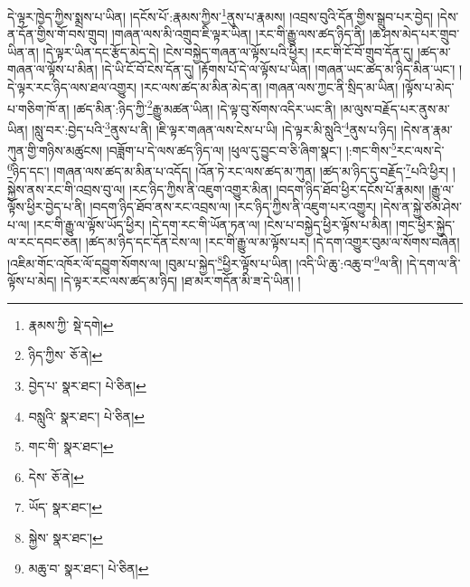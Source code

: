 དེ་ལྟར་ཁྱེད་ཀྱིས་སྨྲས་པ་ཡིན། །དངོས་པོ་:རྣམས་ཀྱིས་\footnote{རྣམས་ཀྱི་  སྡེ་དགེ། }ནུས་པ་རྣམས། །འབྲས་བུའི་དོན་གྱིས་སྒྲུབ་པར་བྱེད། །དེས་ན་དོན་གྱིས་གོ་བས་གྲུབ། །གཞན་ལས་མི་འགྲུབ་ཇི་ལྟར་ཡིན། །རང་གི་རྒྱུ་ལས་ཚད་ཉིད་ནི། །ཆ་ཤས་མེད་པར་གྲུབ་ཡིན་ན། །དེ་ལྟར་ཡིན་དང་རྩོད་མེད་དེ། །ངེས་བསྐྱེད་གཞན་ལ་ལྟོས་པའི་ཕྱིར། །རང་གི་ངོ་བོ་གྲུབ་དོན་དུ། །ཚད་མ་གཞན་ལ་ལྟོས་པ་མིན། །དེ་ཡི་ངོ་བོ་ངེས་དོན་དུ། །རྟོགས་པོ་དེ་ལ་ལྟོས་པ་ཡིན། །གཞན་ཡང་ཚད་མ་ཉིད་མིན་ཡང་། །དེ་ལྟར་རང་ཉིད་ལས་ཐལ་འགྱུར། །རང་ལས་ཚད་མ་མིན་མེད་ན། །གཞན་ལས་ཀྱང་ནི་སྲིད་མ་ཡིན། །ལྟོས་པ་མེད་པ་གཅིག་ཁོ་ན། །ཚད་མིན་:ཉིད་ཀྱི་\footnote{ཉིད་ཀྱིས་  ཅོ་ནེ། }རྒྱུ་མཚན་ཡིན། །དེ་ལྟ་བུ་སོགས་འདིར་ཡང་ནི། །མ་ལུས་བརྗོད་པར་ནུས་མ་ཡིན། །སླུ་བར་:བྱེད་པའི་\footnote{བྱེད་པ་  སྣར་ཐང་།  པེ་ཅིན། }ནུས་པ་ནི། །ཇི་ལྟར་གཞན་ལས་ངེས་པ་ཡི། །དེ་ལྟར་མི་སླུའི་\footnote{བསླུའི་  སྣར་ཐང་།  པེ་ཅིན། }ནུས་པ་ཉིད། །དེས་ན་རྣམ་ཀུན་གྱི་གཉིས་མཚུངས། །བཟློག་པ་དེ་ལས་ཚད་ཉིད་ལ། །ཕུལ་དུ་བྱུང་བ་ཅི་ཞིག་སྣང་། །:གང་གིས་\footnote{གང་གི་  སྣར་ཐང་། }རང་ལས་དེ་\footnote{དེས་  ཅོ་ནེ། }ཉིད་དང་། །གཞན་ལས་ཚད་མ་མིན་པ་འདོད། །འོན་ཏེ་རང་ལས་ཚད་མ་ཀུན། །ཚད་མ་ཉིད་དུ་བརྗོད་\footnote{ཡོད་  སྣར་ཐང་། }པའི་ཕྱིར། །སྐྱེས་ནས་རང་གི་འབྲས་བུ་ལ། །རང་ཉིད་ཀྱིས་ནི་འཇུག་འགྱུར་མིན། །བདག་ཉིད་ཐོབ་ཕྱིར་དངོས་པོ་རྣམས། །རྒྱུ་ལ་ལྟོས་ཕྱིར་བྱེད་པ་ནི། །བདག་ཉིད་ཐོབ་ནས་རང་འབྲས་ལ། །རང་ཉིད་ཀྱིས་ནི་འཇུག་པར་འགྱུར། །དེས་ན་སྐྱེ་ཙམ་ཤེས་པ་ལ། །རང་གི་རྒྱུ་ལ་ལྟོས་ཡོད་ཕྱིར། །དེ་དག་རང་གི་ཡོན་ཏན་ལ། །ངེས་པ་བསྐྱེད་ཕྱིར་ལྟོས་པ་མིན། །གང་ཕྱིར་སྐྱེད་ལ་རང་དབང་ཅན། །ཚད་མ་ཉིད་དང་དོན་ངེས་ལ། །རང་གི་རྒྱུ་ལ་མ་ལྟོས་པར། །དེ་དག་འགྱུར་བུམ་ལ་སོགས་བཞིན། །འཇིམ་གོང་འཁོར་ལོ་དབྱུག་སོགས་ལ། །བུམ་པ་སྐྱེད་\footnote{སྐྱེས་  སྣར་ཐང་། }ཕྱིར་ལྟོས་པ་ཡིན། །འདི་ཡི་ཆུ་:འཆུ་བ་\footnote{མཆུ་བ་  སྣར་ཐང་།  པེ་ཅིན། }ལ་ནི། །དེ་དག་ལ་ནི་ལྟོས་པ་མེད། །དེ་ལྟར་རང་ལས་ཚད་མ་ཉིད། །ཐ་མར་གདོན་མི་ཟ་དེ་ཡིན། །
